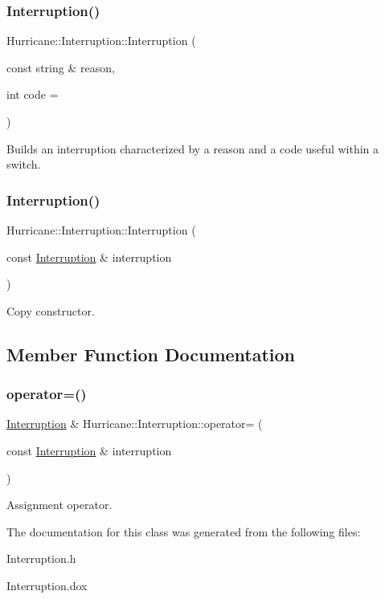 \subsubsection{\texorpdfstring{Interruption()}{Interruption()}\hspace{0.1cm}{\footnotesize\ttfamily [1/2]}}
{\footnotesize\ttfamily Hurricane\+::\+Interruption\+::\+Interruption (\begin{DoxyParamCaption}\item[{const string \&}]{reason,  }\item[{int}]{code = {} }\end{DoxyParamCaption})}

Builds an interruption characterized by a reason and a code useful within a switch. \mbox{\label{classHurricane_1_1Interruption_ad84fb4212bce9f3a85b90b4a969226a6}} 
\subsubsection{\texorpdfstring{Interruption()}{Interruption()}\hspace{0.1cm}{\footnotesize\ttfamily [2/2]}}
{\footnotesize\ttfamily Hurricane\+::\+Interruption\+::\+Interruption (\begin{DoxyParamCaption}\item[{const \hyperlink{classHurricane_1_1Interruption}{Interruption} \&}]{interruption }\end{DoxyParamCaption})}

Copy constructor. 

\subsection{Member Function Documentation}
\mbox{\label{classHurricane_1_1Interruption_a3c528402a234e354e508b5b7512475bc}} 
\subsubsection{\texorpdfstring{operator=()}{operator=()}}
{\footnotesize\ttfamily \hyperlink{classHurricane_1_1Interruption}{Interruption} \& Hurricane\+::\+Interruption\+::operator= (\begin{DoxyParamCaption}\item[{const \hyperlink{classHurricane_1_1Interruption}{Interruption} \&}]{interruption }\end{DoxyParamCaption})}

Assignment operator. 

The documentation for this class was generated from the following files\+:\begin{DoxyCompactItemize}
\item 
Interruption.\+h\item 
Interruption.\+dox\end{DoxyCompactItemize}
